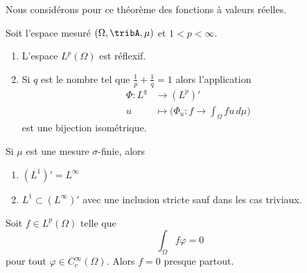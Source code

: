 \begin{theorem} \label{ThoSCiPRpq}
    Nous considérons pour ce théorème des fonctions à valeurs réelles.

    Soit l'espace mesuré \( (\Omega,\tribA,\mu)\) et \( 1<p<\infty\).
    \begin{enumerate}
        \item
            L'espace \( L^p(\Omega)\) est réflexif.
        \item
            Si \( q\) est le nombre tel que \( \frac{1}{ p }+\frac{1}{ q }=1\) alors l'application
            \begin{equation}
                \begin{aligned}
                    \Phi\colon L^q&\to (L^p)' \\
                    u&\mapsto \Big( \Phi_u\colon f\to \int_{\Omega}fu\,d\mu \Big)
                \end{aligned}
            \end{equation}
            est une bijection isométrique.
    \end{enumerate}
    Si \( \mu\) est une mesure \( \sigma\)-finie, alors
    \begin{enumerate}
        \item
            \( (L^1)'=L^{\infty}\)
        \item
            \( L^1\subset (L^{\infty})' \) avec une inclusion stricte sauf dans les cas triviaux.
    \end{enumerate}
\end{theorem}

\begin{proposition} \label{PropUKLZZZh}
    Soit \( f\in L^p(\Omega)\) telle que
    \begin{equation}
        \int_{\Omega}f\varphi=0
    \end{equation}
    pour tout \( \varphi\in C^{\infty}_c(\Omega)\). Alors \( f=0\) presque partout.
\end{proposition}

